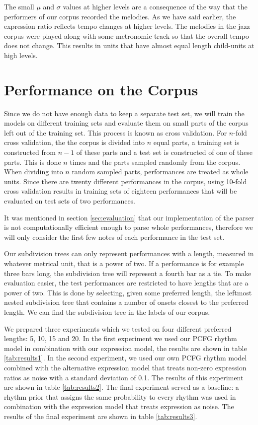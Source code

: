 The small $\mu$ and $\sigma$ values at higher levels are a consequence of the way that the performers of our corpus recorded the melodies. As we have said earlier, the expression ratio reflects tempo changes at higher levels. The melodies in the jazz corpus were played along with some metronomic track so that the overall tempo does not change. This results in units that have almost equal length child-units at high levels.

\section{Performance on the Corpus}

Since we do not have enough data to keep a separate test set, we will train the models on different training sets and evaluate them on small parts of the corpus left out of the training set. This process is known as cross validation. For $n$-fold cross validation, the the corpus is divided into $n$ equal parts, a training set is constructed from $n-1$ of these parts and a test set is constructed of one of these parts. This is done $n$ times and the parts sampled randomly from the corpus. When dividing into $n$ random sampled parts, performances are treated as whole units. Since there are twenty different performances in the corpus, using 10-fold cross validation results in training sets of eighteen performances that will be evaluated on test sets of two performances.

It was mentioned in section \ref{sec:evaluation} that our implementation of the parser is not computationally efficient enough to parse whole performances, therefore we will only consider the first few notes of each performance in the test set. 

Our subdivision trees can only represent performances with a length, measured in whatever metrical unit, that is a power of two. If a performance is for example three bars long, the subdivision tree will represent a fourth bar as a tie. To make evaluation easier, the test performances are restricted to have lengths that are a power of two. This is done by selecting, given some preferred length, the leftmost nested subdivision tree that contains a number of onsets closest to the preferred length. We can find the subdivision tree in the labels of our corpus.

We prepared three experiments which we tested on four different preferred lengths: 5, 10, 15 and 20. In the first experiment we used our PCFG rhythm model in combination with our expression model, the results are shown in table \ref{tab:results1}. In the second experiment, we used our own PCFG rhythm model combined with the alternative expression model that treats non-zero expression ratios as noise with a standard deviation of 0.1. The results of this experiment are shown in table \ref{tab:results2}. The final experiment served as a baseline: a rhythm prior that assigns the same probability to every rhythm was used in combination with the expression model that treats expression as noise. The results of the final experiment are shown in table \ref{tab:results3}.


